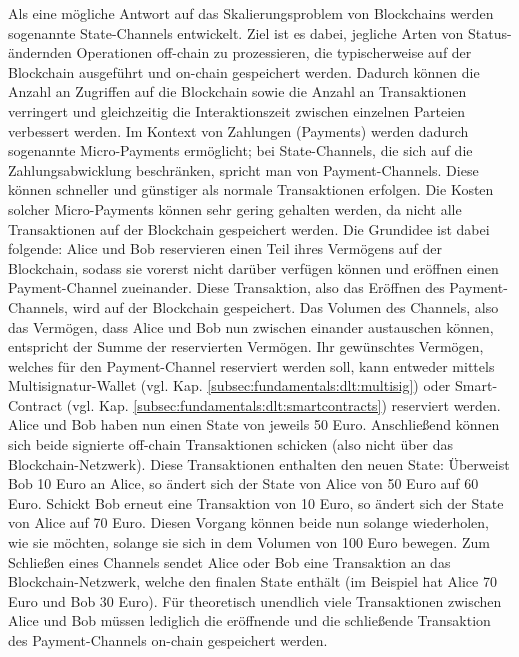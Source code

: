 Als eine mögliche Antwort auf das Skalierungsproblem von Blockchains werden sogenannte State-Channels entwickelt. Ziel ist es dabei, jegliche Arten von Status-ändernden Operationen off-chain zu prozessieren, die typischerweise auf der Blockchain ausgeführt und on-chain gespeichert werden. Dadurch können die Anzahl an Zugriffen auf die Blockchain sowie die Anzahl an Transaktionen verringert und gleichzeitig die Interaktionszeit zwischen einzelnen Parteien verbessert werden. Im Kontext von Zahlungen (Payments) werden dadurch sogenannte Micro-Payments ermöglicht; bei State-Channels, die sich auf die Zahlungsabwicklung beschränken, spricht man von Payment-Channels. Diese können schneller und günstiger als normale Transaktionen erfolgen. Die Kosten solcher Micro-Payments können sehr gering gehalten werden, da nicht alle Transaktionen auf der Blockchain gespeichert werden. Die Grundidee ist dabei folgende: Alice und Bob reservieren einen Teil ihres Vermögens auf der Blockchain, sodass sie vorerst nicht darüber verfügen können und eröffnen einen Payment-Channel zueinander. Diese Transaktion, also das Eröffnen des Payment-Channels, wird auf der Blockchain gespeichert. Das Volumen des Channels, also das Vermögen, dass Alice und Bob nun zwischen einander austauschen können, entspricht der Summe der reservierten Vermögen. Ihr gewünschtes Vermögen, welches für den Payment-Channel reserviert werden soll, kann entweder mittels Multisignatur-Wallet (vgl. Kap. \ref{subsec:fundamentals:dlt:multisig}) oder Smart-Contract (vgl. Kap. \ref{subsec:fundamentals:dlt:smartcontracts}) reserviert werden. Alice und Bob haben nun einen State von jeweils 50 Euro. Anschließend können sich beide signierte off-chain Transaktionen schicken (also nicht über das Blockchain-Netzwerk). Diese Transaktionen enthalten den neuen State: Überweist Bob 10 Euro an Alice, so ändert sich der State von Alice von 50 Euro auf 60 Euro. Schickt Bob erneut eine Transaktion von 10 Euro, so ändert sich der State von Alice auf 70 Euro. Diesen Vorgang können beide nun solange wiederholen, wie sie möchten, solange sie sich in dem Volumen von 100 Euro bewegen. Zum Schließen eines Channels sendet Alice oder Bob eine Transaktion an das Blockchain-Netzwerk, welche den finalen State enthält (im Beispiel hat Alice 70 Euro und Bob 30 Euro). Für theoretisch unendlich viele Transaktionen zwischen Alice und Bob müssen lediglich die eröffnende und die schließende Transaktion des Payment-Channels on-chain gespeichert werden.\\

